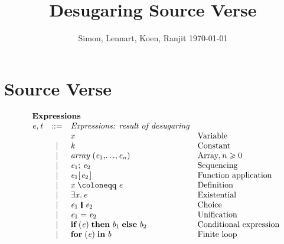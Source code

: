 \documentclass[acmsmall,screen]{acmart}\settopmatter{}
\newcommand{\Varid}[1]{\mathit{#1}}
\renewcommand{\geq}{\geqslant}
\newcommand{\vb}{\; \ensuremath{\mathop{\mid}} \;}
\newenvironment{figurebox}{\begin{figure}\begin{framed}}{\end{framed}\end{figure}}
\begin{document}
\title{Desugaring Source Verse}
\author{Simon, Lennart, Koen, Ranjit \today}
\maketitle

\section{Source Verse}

\begin{figurebox}
$$
\begin{array}{rcll}
\multicolumn{4}{l}{\bf Expressions} \\
  \ensuremath{\Varid{e},\Varid{t}} & ::= & \textit{Expressions: result of desugaring} \\
      &     & \ensuremath{\Varid{x}}               & \text{Variable} \\
      & \vb & \ensuremath{\Varid{k}}               & \text{Constant} \\
      & \vb & \ensuremath{\Varid{array}\;(\Varid{e}_{\mathrm{1}},\!\ldots\!,\Varid{e}_{\Varid{n}})} & \text{Array}, n \geq 0 \\
      & \vb & \ensuremath{\Varid{e}_{\mathrm{1}};\,\Varid{e}_{\mathrm{2}}}       & \text{Sequencing} \\
      & \vb & \ensuremath{\Varid{e}_{\mathrm{1}} [\mskip1.5mu \Varid{e}_{\mathrm{2}}\mskip1.5mu]}       & \text{Function application} \\
      & \vb & \ensuremath{\Varid{x}\mathrel{\coloneqq}\Varid{e}}          & \text{Definition} \\
      & \vb & \ensuremath{\exists\Varid{x}.\,\Varid{e}}         & \text{Existential} \\
      & \vb & \ensuremath{\Varid{e}_{\mathrm{1}}\hspace{0.2em}\mathop{\rule[-0.1em]{0.15em}{0.75em}}\hspace{0.2em}\Varid{e}_{\mathrm{2}}} & \text{Choice} \\
      & \vb & \ensuremath{\Varid{e}_{\mathrm{1}}\mathrel{=}\Varid{e}_{\mathrm{2}}}       & \text{Unification} \\
      & \vb & \ensuremath{\textbf{if}\;(\Varid{e})\;\textbf{then}\;\Varid{b}_{\mathrm{1}}\;\textbf{else}\;\Varid{b}_{\mathrm{2}}} & \text{Conditional expression} \\
      & \vb & \ensuremath{\textbf{for}\;(\Varid{e})\;\textbf{in}\;\Varid{b}}     & \text{Finite loop} \\

\end{array}$$
\end{figurebox}
\end{document}
